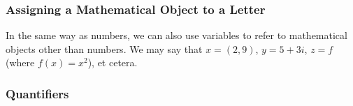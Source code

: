   \subsubsection{Assigning a Mathematical Object to a Letter}
  In the same way as numbers, we can also use variables to refer to
  mathematical objects other than numbers. We may say that $x = (2, 9)$,
  $y = 5 + 3i$, $z = f$ (where $f(x) = x^2$), et cetera.

  \subsubsection{Quantifiers}

